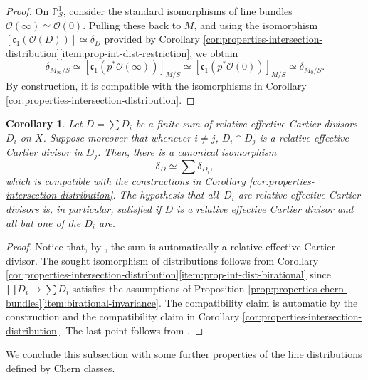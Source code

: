 \documentclass[11pt]{article}
\theoremstyle{plain}
\newtheorem{corollary}[theorem]{Corollary}
\theoremstyle{definition}
\newcommand{\PBbb}{\mathbb P}
\newcommand{\Ocal}{\mathcal O}
\newcommand{\cfrak}{\mathfrak c}
\begin{document}
\begin{proof}
On $\PBbb^{1}_{S}$, consider the standard isomorphisms of line bundles $\Ocal(\infty)\simeq\Ocal(0)$. Pulling these back to $M$, and using the isomorphism $[\cfrak_{1}(\Ocal(D))]\simeq\delta_{D}$ provided by Corollary \ref{cor:properties-intersection-distribution}\eqref{item:prop-int-dist-restriction}, we obtain
\begin{displaymath}
\delta_{M_\infty/S}\simeq [\cfrak_{1}(p^\ast \Ocal(\infty))]_{M/S} \simeq [\cfrak_{1}(p^\ast \Ocal(0))]_{M/S} \simeq \delta_{M_0/S}.
\end{displaymath}
By construction, it is compatible with the isomorphisms in Corollary \ref{cor:properties-intersection-distribution}.
\end{proof}

\begin{corollary}
Let $D = \sum D_i$ be a finite sum of relative effective Cartier divisors~$D_i$ on $X$. Suppose moreover that whenever $i\neq j$, $D_i \cap D_j$ is a relative effective Cartier divisor in $D_j$. Then, there is a canonical isomorphism
\begin{displaymath}
\delta_{D}\simeq \sum \delta_{D_i},
\end{displaymath}
which is compatible with the constructions in Corollary \ref{cor:properties-intersection-distribution}. The hypothesis that all~$D_i$ are relative effective Cartier divisors is, in particular, satisfied if $D$ is a relative effective Cartier divisor and all but one of the $D_i$ are.
\end{corollary}
\begin{proof}
Notice that, by \cite[\href{https://stacks.math.columbia.edu/tag/0B8V}{0B8U}]{stacks-project}, the sum is automatically a relative effective Cartier divisor. The sought isomorphism of distributions follows from Corollary \ref{cor:properties-intersection-distribution}\eqref{item:prop-int-dist-birational} since $\bigsqcup D_i \to \sum D_i$ satisfies the assumptions of Proposition \ref{prop:properties-chern-bundles}\eqref{item:birational-invariance}. The compatibility claim is automatic by the construction and the compatibility claim in Corollary \ref{cor:properties-intersection-distribution}. The last point follows from \cite[\href{https://stacks.math.columbia.edu/tag/0B8V}{0B8V}]{stacks-project}.
\end{proof}

We conclude this subsection with some further properties of the line distributions defined by Chern classes.
\end{document}
